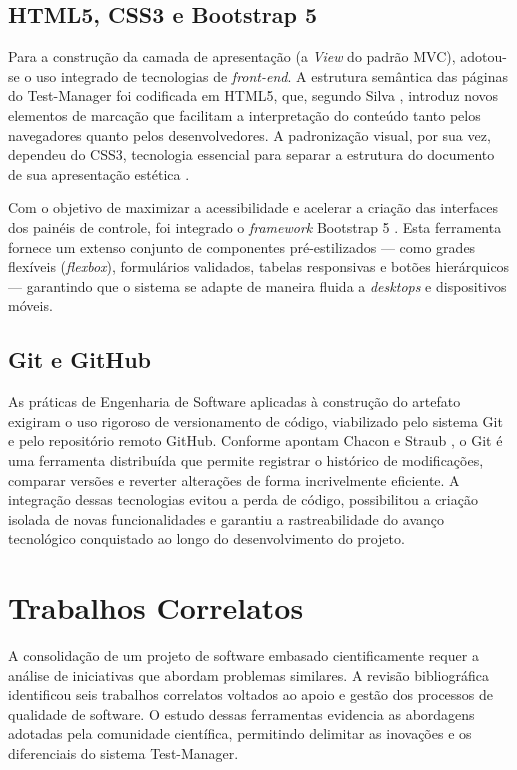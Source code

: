 \subsection{HTML5, CSS3 e Bootstrap 5}
Para a construção da camada de apresentação (a \textit{View} do padrão MVC), adotou-se o uso integrado de tecnologias de \textit{front-end}. A estrutura semântica das páginas do Test-Manager foi codificada em HTML5, que, segundo Silva \cite{silva2014}, introduz novos elementos de marcação que facilitam a interpretação do conteúdo tanto pelos navegadores quanto pelos desenvolvedores. A padronização visual, por sua vez, dependeu do CSS3, tecnologia essencial para separar a estrutura do documento de sua apresentação estética \cite{silva2012}. 

Com o objetivo de maximizar a acessibilidade e acelerar a criação das interfaces dos painéis de controle, foi integrado o \textit{framework} Bootstrap 5 \cite{bootstrap2026}. Esta ferramenta fornece um extenso conjunto de componentes pré-estilizados --- como grades flexíveis (\textit{flexbox}), formulários validados, tabelas responsivas e botões hierárquicos --- garantindo que o sistema se adapte de maneira fluida a \textit{desktops} e dispositivos móveis.

\subsection{Git e GitHub}
As práticas de Engenharia de Software aplicadas à construção do artefato exigiram o uso rigoroso de versionamento de código, viabilizado pelo sistema Git e pelo repositório remoto GitHub. Conforme apontam Chacon e Straub \cite{chacon2014}, o Git é uma ferramenta distribuída que permite registrar o histórico de modificações, comparar versões e reverter alterações de forma incrivelmente eficiente. A integração dessas tecnologias evitou a perda de código, possibilitou a criação isolada de novas funcionalidades e garantiu a rastreabilidade do avanço tecnológico conquistado ao longo do desenvolvimento do projeto.

\section{Trabalhos Correlatos}

A consolidação de um projeto de software embasado cientificamente requer a análise de iniciativas que abordam problemas similares. A revisão bibliográfica identificou seis trabalhos correlatos voltados ao apoio e gestão dos processos de qualidade de software. O estudo dessas ferramentas evidencia as abordagens adotadas pela comunidade científica, permitindo delimitar as inovações e os diferenciais do sistema Test-Manager.

